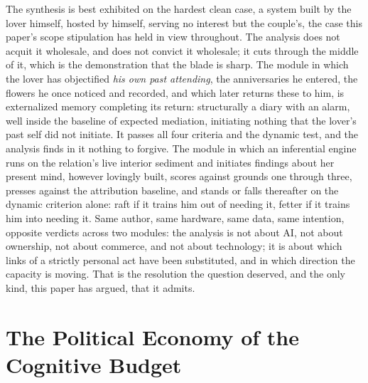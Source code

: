 The synthesis is best exhibited on the hardest clean case, a system built by the lover himself, hosted by himself, serving no interest but the couple's, the case this paper's scope stipulation has held in view throughout. The analysis does not acquit it wholesale, and does not convict it wholesale; it cuts through the middle of it, which is the demonstration that the blade is sharp. The module in which the lover has objectified \emph{his own past attending}, the anniversaries he entered, the flowers he once noticed and recorded, and which later returns these to him, is externalized memory completing its return: structurally a diary with an alarm, well inside the baseline of expected mediation, initiating nothing that the lover's past self did not initiate. It passes all four criteria and the dynamic test, and the analysis finds in it nothing to forgive. The module in which an inferential engine runs on the relation's live interior sediment and initiates findings about her present mind, however lovingly built, scores against grounds one through three, presses against the attribution baseline, and stands or falls thereafter on the dynamic criterion alone: raft if it trains him out of needing it, fetter if it trains him into needing it. Same author, same hardware, same data, same intention, opposite verdicts across two modules: the analysis is not about AI, not about ownership, not about commerce, and not about technology; it is about which links of a strictly personal act have been substituted, and in which direction the capacity is moving. That is the resolution the question deserved, and the only kind, this paper has argued, that it admits.

\section{The Political Economy of the Cognitive Budget}
\label{p02:sec:poleconomy}

